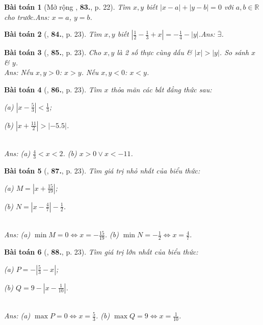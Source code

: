 \documentclass{article}
\numberwithin{equation}{section}
\newtheorem{baitoan}{Bài toán}
\begin{document}
\begin{baitoan}[Mở rộng \cite{Tuyen_Toan_7}, \textbf{83.}, p. 22]
	Tìm $x,y$ biết $|x - a| + |y - b| = 0$ với $a,b\in\mathbb{R}$ cho trước.\hfill{\sf Ans:} $x = a$, $y = b$.
\end{baitoan}

\begin{baitoan}[\cite{Tuyen_Toan_7}, \textbf{84.}, p. 23]
	Tìm $x,y$ biết $\left|\frac{1}{2} - \frac{1}{3} + x\right| = -\frac{1}{4} - |y|$.\hfill{\sf Ans:} $\overline{\exists}$.
\end{baitoan}

\begin{baitoan}[\cite{Tuyen_Toan_7}, \textbf{85.}, p. 23]
	Cho $x,y$ là 2 số thực cùng dấu \& $|x| > |y|$. So sánh $x$ \& $y$.\\\mbox{}\hfill{\sf Ans:} Nếu $x,y > 0$: $x > y$. Nếu $x,y < 0$: $x < y$.
\end{baitoan}

\begin{baitoan}[\cite{Tuyen_Toan_7}, \textbf{86.}, p. 23]
	Tìm $x$ thỏa mãn các bất đẳng thức sau:
	\begin{enumerate*}
		\item[(a)] $\left|x - \frac{5}{3}\right| < \frac{1}{3}$;
		\item[(b)] $\left|x + \frac{11}{2}\right| > |-5.5|$.
	\end{enumerate*}\\\mbox{}\hfill{\sf Ans:} (a) $\frac{4}{3} < x < 2$. (b) $x > 0\lor x < -11$.
\end{baitoan}

\begin{baitoan}[\cite{Tuyen_Toan_7}, \textbf{87.}, p. 23]
	Tìm giá trị nhỏ nhất của biểu thức:
	\begin{enumerate*}
		\item[(a)] $M = \left|x + \frac{15}{19}\right|$;
		\item[(b)] $N = \left|x - \frac{4}{7}\right| - \frac{1}{2}$.
	\end{enumerate*}\\\mbox{}\hfill{\sf Ans:} (a) $\min M = 0\Leftrightarrow x = -\frac{15}{19}$. (b) $\min N = -\frac{1}{2}\Leftrightarrow x = \frac{4}{7}$.
\end{baitoan}

\begin{baitoan}[\cite{Tuyen_Toan_7}, \textbf{88.}, p. 23]
	Tìm giá trị lớn nhất của biểu thức:
	\begin{enumerate*}
		\item[(a)] $P = -\left|\frac{5}{3} - x\right|$;
		\item[(b)] $Q = 9 - \left|x - \frac{1}{10}\right|$.
	\end{enumerate*}\\\mbox{}\hfill{\sf Ans:} (a) $\max P = 0\Leftrightarrow x = \frac{5}{3}$. (b) $\max Q = 9\Leftrightarrow x = \frac{1}{10}$.
\end{baitoan}
\end{document}
